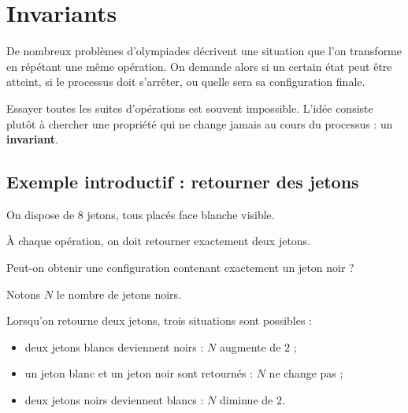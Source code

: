 \chapter{Invariants}

De nombreux problèmes d'olympiades décrivent une situation que l'on transforme
en répétant une même opération. On demande alors si un certain état peut être
atteint, si le processus doit s'arrêter, ou quelle sera sa configuration finale.

Essayer toutes les suites d'opérations est souvent impossible. L'idée consiste
plutôt à chercher une propriété qui ne change jamais au cours du processus :
un \textbf{invariant}.

\section{Exemple introductif : retourner des jetons}

On dispose de \(8\) jetons, tous placés face blanche visible.

À chaque opération, on doit retourner exactement deux jetons.

Peut-on obtenir une configuration contenant exactement un jeton noir ?

\begin{center}
\end{center}

Notons \(N\) le nombre de jetons noirs.

Lorsqu'on retourne deux jetons, trois situations sont possibles :

\begin{itemize}
    \item deux jetons blancs deviennent noirs : \(N\) augmente de \(2\) ;
    \item un jeton blanc et un jeton noir sont retournés : \(N\) ne change pas ;
    \item deux jetons noirs deviennent blancs : \(N\) diminue de \(2\).
\end{itemize}

